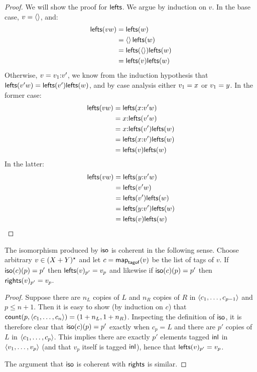 \begin{proof}
We will show the proof for $\mathsf{lefts}$. We argue by induction on $v$. In
the base case, $v=\left<\right>$, and:
\begin{align*}
    \mathsf{lefts}(vw)
        &= \mathsf{lefts}(w) \\
        &= \left<\right>\mathsf{lefts}(w) \\
        &= \mathsf{lefts}(\left<\right>)\mathsf{lefts}(w) \\
        &= \mathsf{lefts}(v)\mathsf{lefts}(w)
\end{align*}
Otherwise, $v=v_1 \mathord{:} v'$, we know from the induction hypothesis that
$\mathsf{lefts}(v'w)=\mathsf{lefts}(v')\mathsf{lefts}(w)$, and by case analysis either
$v_1= x$ or $v_1= y$. In the former case:
\begin{align*}
    \mathsf{lefts}(vw)
        &= \mathsf{lefts}( x \mathord{:} v'w) \\
        &= x\mathord{:}\mathsf{lefts}(v'w) \\
        &= x\mathord{:}\mathsf{lefts}(v')\mathsf{lefts}(w) \\
        &= \mathsf{lefts}( x \mathord{:} v')\mathsf{lefts}(w) \\
        &= \mathsf{lefts}(v)\mathsf{lefts}(w)
\end{align*}
In the latter:
\begin{align*}
    \mathsf{lefts}(vw)
        &= \mathsf{lefts}( y \mathord{:} v'w) \\
        &= \mathsf{lefts}(v'w) \\
        &= \mathsf{lefts}(v')\mathsf{lefts}(w) \\
        &= \mathsf{lefts}( y \mathord{:} v')\mathsf{lefts}(w) \\
        &= \mathsf{lefts}(v)\mathsf{lefts}(w)
\end{align*}
\end{proof}

\begin{lemma}
\label{lemma:iso-coherent}
The isomorphism produced by $\mathsf{iso}$ is coherent in the following sense.
Choose arbitrary $v\in(X+Y)^\star$ and let $c=\mathsf{map}_{\mathsf{tagof}}(v)$ be
the list of tags of $v$. If $\mathsf{iso}(c)(p)={p'}$ then
${\mathsf{lefts}(v)_{p'}}=v_p$ and likewise if $\mathsf{iso}(c)(p)={p'}$
then ${\mathsf{rights}(v)_{p'}}=v_p$.
\end{lemma}

\begin{proof}
Suppose there are $n_L$ copies of $L$ and $n_R$ copies of $R$ in $\left< c_1
,\ldots, c_{p-1} \right>$ and $p \le n+1$. Then it is easy to show (by
induction on $c$) that $\mathsf{count}(p,\left< c_1 ,\ldots, c_n
\right>)=(1+n_L,1+n_R)$. Inspecting the definition of $\mathsf{iso}$, it is
therefore clear that $\mathsf{iso}(c)(p)={p'}$ exactly when $c_p=L$ and
there are $p'$ copies of $L$ in $\left< c_1 ,\ldots, c_p \right>$. This implies
there are exactly $p'$ elements tagged $\mathsf{inl}$ in $\left< v_1 ,\ldots, v_p
\right>$ (and that $v_p$ itself is tagged $\mathsf{inl}$), hence that
${\mathsf{lefts}(v)_{p'}}=v_p$.

The argument that $\mathsf{iso}$ is coherent with $\mathsf{rights}$ is similar.
\end{proof}

